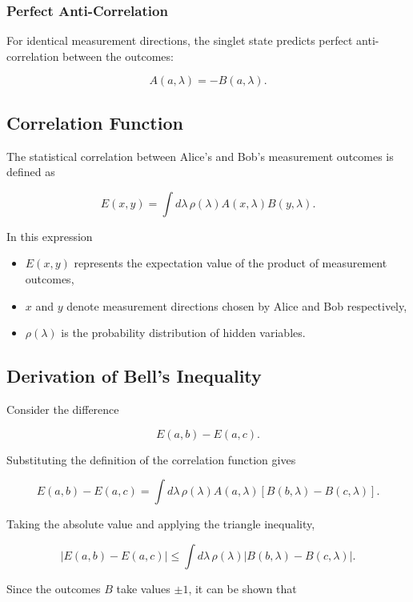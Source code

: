 \documentclass[14pt,a4paper]{extarticle}
\begin{document}
\subsubsection{Perfect Anti-Correlation}

For identical measurement directions, the singlet state predicts perfect anti-correlation between the outcomes:

\[
A(a,\lambda) = -B(a,\lambda).
\]


\subsection{Correlation Function}

The statistical correlation between Alice’s and Bob’s measurement outcomes is defined as

\[
E(x,y) =
\int d\lambda \, \rho(\lambda) A(x,\lambda) B(y,\lambda).
\]

In this expression

\begin{itemize}
\item $E(x,y)$ represents the expectation value of the product of measurement outcomes,
\item $x$ and $y$ denote measurement directions chosen by Alice and Bob respectively,
\item $\rho(\lambda)$ is the probability distribution of hidden variables.
\end{itemize}


\subsection{Derivation of Bell's Inequality}

Consider the difference

\[
E(a,b) - E(a,c).
\]

Substituting the definition of the correlation function gives

\[
E(a,b) - E(a,c)
=
\int d\lambda \, \rho(\lambda)
A(a,\lambda)
\left[
B(b,\lambda) - B(c,\lambda)
\right].
\]

Taking the absolute value and applying the triangle inequality,

\[
|E(a,b) - E(a,c)|
\le
\int d\lambda \, \rho(\lambda)
|B(b,\lambda) - B(c,\lambda)|.
\]

Since the outcomes $B$ take values $\pm1$, it can be shown that
\end{document}
